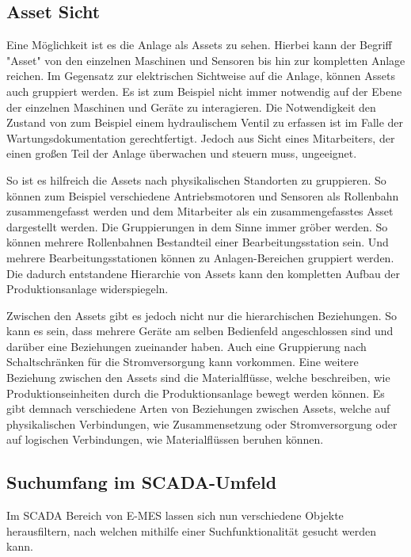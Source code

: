 \subsection{Asset Sicht\label{subsec3.2.2:Unterunterpunkt-2}}
Eine Möglichkeit ist es die Anlage als Assets zu sehen. Hierbei kann der Begriff "Asset" von den einzelnen Maschinen und Sensoren bis hin zur kompletten Anlage reichen. Im Gegensatz zur elektrischen Sichtweise auf die Anlage, können Assets auch gruppiert werden. Es ist zum Beispiel nicht immer notwendig auf der Ebene der einzelnen Maschinen und Geräte zu interagieren. Die Notwendigkeit den Zustand von zum Beispiel einem hydraulischem Ventil zu erfassen ist im Falle der Wartungsdokumentation gerechtfertigt. Jedoch aus Sicht eines Mitarbeiters, der einen großen Teil der Anlage überwachen und steuern muss, ungeeignet.

So ist es hilfreich die Assets nach physikalischen Standorten zu gruppieren. So können zum Beispiel verschiedene Antriebsmotoren und Sensoren als Rollenbahn zusammengefasst werden und dem Mitarbeiter als ein zusammengefasstes Asset dargestellt werden. Die Gruppierungen in dem Sinne immer gröber werden. So können mehrere Rollenbahnen Bestandteil einer Bearbeitungsstation sein. Und mehrere Bearbeitungsstationen können zu Anlagen-Bereichen gruppiert werden. Die dadurch entstandene Hierarchie von Assets kann den kompletten Aufbau der Produktionsanlage widerspiegeln.

Zwischen den Assets gibt es jedoch nicht nur die hierarchischen Beziehungen. So kann es sein, dass mehrere Geräte am selben Bedienfeld angeschlossen sind und darüber eine Beziehungen zueinander haben. Auch eine Gruppierung nach Schaltschränken für die Stromversorgung kann vorkommen. Eine weitere Beziehung zwischen den Assets sind die Materialflüsse, welche beschreiben, wie Produktionseinheiten durch die Produktionsanlage bewegt werden können. Es gibt demnach verschiedene Arten von Beziehungen zwischen Assets, welche auf physikalischen Verbindungen, wie Zusammensetzung oder Stromversorgung oder auf logischen Verbindungen, wie Materialflüssen beruhen können.

\subsection{Suchumfang im SCADA-Umfeld\label{subsec3.2.3:Unterunterpunkt-3}}
Im SCADA Bereich von E-MES lassen sich nun verschiedene Objekte herausfiltern, nach welchen mithilfe einer Suchfunktionalität gesucht werden kann.

